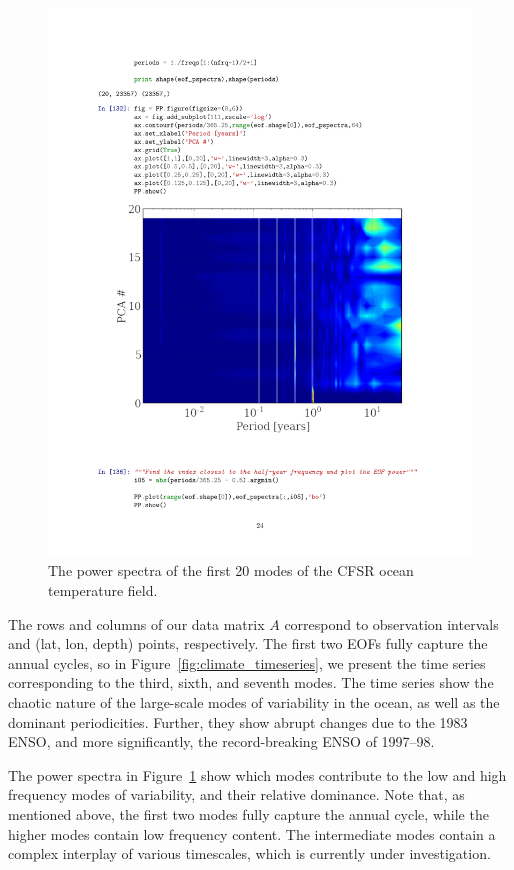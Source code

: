   \begin{figure}[h!bt]
    \centering
    \includegraphics[width=.9\columnwidth]{images/climate_spectra.pdf}
    \caption{The power spectra of the first 20 modes of the CFSR ocean temperature field.}
    \label{fig:climate_spectra}
  \end{figure} 
The rows and columns of our data matrix $A$ correspond to observation intervals
and (lat, lon, depth) points, respectively. The first two EOFs fully capture the annual cycles, so in
Figure~\ref{fig:climate_timeseries}, we present the time series corresponding to the
third, sixth, and seventh modes. The time series show the chaotic nature of the
large-scale modes of variability in the ocean, as well as the dominant
periodicities. Further, they show abrupt changes due to the 1983 ENSO,
and more significantly, the record-breaking ENSO of 1997--98.

The power spectra in Figure~\ref{fig:climate_spectra} show which modes contribute to
the low and high frequency modes of variability, and their relative dominance.
Note that, as mentioned above, the first two modes fully capture the annual
cycle, while the higher modes contain low frequency content. The intermediate
modes contain a complex interplay of various timescales, which is currently
under investigation.  


